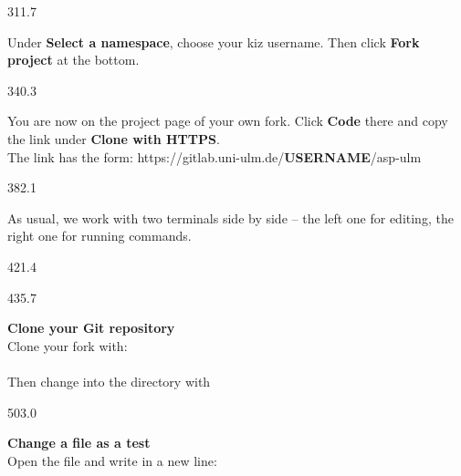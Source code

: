 \documentclass{aslab}
\begin{document}
\begin{region}[pitch=14.3]{311.7}
\begin{tasks}[start=4]
\item Under \textbf{Select a namespace}, choose your kiz username. Then click
  \textbf{Fork project} at the bottom.
\end{tasks}
\end{region}

\begin{region}[pitch=14.25]{340.3}
\begin{tasks}[start=5]
\item You are now on the project page of your own fork. Click \textbf{Code}
  there and copy the link under \textbf{Clone with HTTPS}.\\
  The link has the form: {\color{aslabblue}https://gitlab.uni-ulm.de/\textbf{USERNAME}/asp-ulm}
\end{tasks}
\end{region}

\begin{region}[pitch=13.2]{382.1}
\begin{tasks}[start=6]
\item As usual, we work with two terminals side by side -- the left one for
  editing, the right one for running commands.
\end{tasks}
\end{region}

\begin{region}{421.4}
\end{region}

\begin{region}[pitch=13.35]{435.7}
\begin{alphatasks}
\item \textbf{Clone your Git repository}\\
  Clone your fork with:\\
  \\
  Then change into the directory with\\
\end{alphatasks}
\end{region}

\begin{region}[pitch=13.6]{503.0}
\begin{alphatasks}[start=2]
\item \textbf{Change a file as a test}\\
  Open the file  and write in a new line:
\end{alphatasks}
\end{region}
\end{document}
